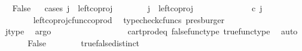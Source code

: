 \begin{isabellebody}
\ \ \isamarkupfalse%
\ False\isanewline
\ \ \isamarkupfalse%
{\isacharparenleft}{\kern0pt}cases\ {\isachardoublequoteopen}j\ {\isacharequal}{\kern0pt}\ left{\isacharunderscore}{\kern0pt}coproj\ {\isasymone}\ {\isasymone}{\isachardoublequoteclose}{\isacharparenright}{\kern0pt}\isanewline
\ \ \ \ \isamarkupfalse%
\ {\isachardoublequoteopen}j\ {\isacharequal}{\kern0pt}\ left{\isacharunderscore}{\kern0pt}coproj\ {\isasymone}\ {\isasymone}{\isachardoublequoteclose}\isanewline
\ \ \ \ \isamarkupfalse%
\ \isamarkupfalse%
\ {\isachardoublequoteopen}{\isacharparenleft}{\kern0pt}{\isasymlangle}{\isasymt}{\isacharcomma}{\kern0pt}\ {\isasymt}{\isasymrangle}\ {\isasymamalg}{\isasymlangle}{\isasymf}{\isacharcomma}{\kern0pt}\ {\isasymf}{\isasymrangle}{\isacharparenright}{\kern0pt}\ {\isasymcirc}\isactrlsub c\ j\ \ {\isacharequal}{\kern0pt}\ {\isasymlangle}{\isasymt}{\isacharcomma}{\kern0pt}\ {\isasymt}{\isasymrangle}{\isachardoublequoteclose}\isanewline
\ \ \ \ \ \ \isamarkupfalse%
\ \ left{\isacharunderscore}{\kern0pt}coproj{\isacharunderscore}{\kern0pt}cfunc{\isacharunderscore}{\kern0pt}coprod\ \isamarkupfalse%
\ {\isacharparenleft}{\kern0pt}typecheck{\isacharunderscore}{\kern0pt}cfuncs{\isacharcomma}{\kern0pt}\ presburger{\isacharparenright}{\kern0pt}\isanewline
\ \ \ \ \isamarkupfalse%
\ \isamarkupfalse%
\ {\isachardoublequoteopen}{\isasymlangle}{\isasymt}{\isacharcomma}{\kern0pt}\ {\isasymf}{\isasymrangle}\ {\isacharequal}{\kern0pt}\ {\isasymlangle}{\isasymt}{\isacharcomma}{\kern0pt}{\isasymt}{\isasymrangle}{\isachardoublequoteclose}\isanewline
\ \ \ \ \ \ \isamarkupfalse%
\ \ j{\isacharunderscore}{\kern0pt}type\ \isamarkupfalse%
\ argo\isanewline
\ \ \ \ \isamarkupfalse%
\ \isamarkupfalse%
\ {\isachardoublequoteopen}{\isasymt}\ {\isacharequal}{\kern0pt}\ {\isasymf}{\isachardoublequoteclose}\isanewline
\ \ \ \ \ \ \isamarkupfalse%
\ cart{\isacharunderscore}{\kern0pt}prod{\isacharunderscore}{\kern0pt}eq{}\ false{\isacharunderscore}{\kern0pt}func{\isacharunderscore}{\kern0pt}type\ true{\isacharunderscore}{\kern0pt}func{\isacharunderscore}{\kern0pt}type\ \isamarkupfalse%
\ auto\isanewline
\ \ \ \ \isamarkupfalse%
\ \isamarkupfalse%
\ False\isanewline
\ \ \ \ \ \ \isamarkupfalse%
\ true{\isacharunderscore}{\kern0pt}false{\isacharunderscore}{\kern0pt}distinct\ \isamarkupfalse%

\end{isabellebody}
